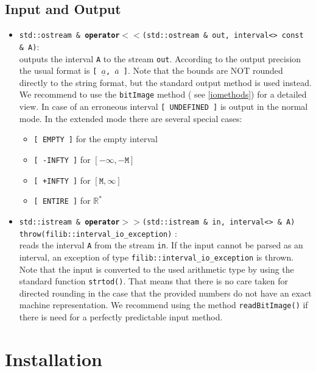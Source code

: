\documentclass{report}
\newcommand{\Rs}{\mathbb{R}^*}
\begin{document}
\section{Input and Output}
\begin{itemize}

		\item
			\texttt{std::ostream \& {\bf operator$<<$}(std::ostream \& out, interval<> const \& A)}:\\
			outputs the interval \texttt{A} to the stream
			\texttt{out}.\label{output} According to the
			output precision the usual format is
			\texttt{[ $\underline{a}$, $\overline{a}$ ]}.
Note that the bounds are NOT rounded directly to the string format, but the
			standard output method is used instead. We recommend to
			use the \texttt{bitImage} method ( see \ref{iomethods})
			for a detailed view.
			In case of an erroneous interval \texttt{[
			UNDEFINED ]} is output in the normal mode.
In the extended mode there are several special cases:
			\begin{itemize}
				\item \texttt{[ EMPTY ]} for the empty interval
				\item \texttt{[ -INFTY ]} for $[-\infty,-\texttt{M}]$
				\item \texttt{[ +INFTY ]} for $[\texttt{M},\infty]$
				\item \texttt{[ ENTIRE ]} for $\Rs$
			\end{itemize}
		\item
			\texttt{std::istream \& {\bf operator$>>$}(std::istream \& in, interval<> \& A)\\
			throw(filib::interval\_io\_exception)}
			:\\
			reads the interval  \texttt{A} from the stream
			\texttt{in}. If the input cannot be parsed as an
			interval, an exception of type \texttt{filib::interval\_io\_exception}
			is thrown. Note that the input is converted to
			the used arithmetic type by using the standard
			function \texttt{strtod()}. That means that there
			is no care taken for directed rounding in the case
			that the provided numbers do not have an exact
			machine representation. We recommend using the
			method \texttt{readBitImage()} if there is need
			for a perfectly predictable input method.
			
\end{itemize}
	\chapter{Installation}
\end{document}
